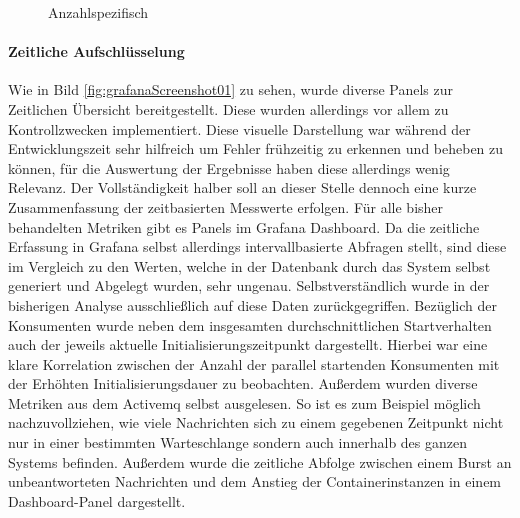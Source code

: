 \begin{figure}
  \centering
  \caption[Startzeit Container - Anzahl spezifisch]{Anzahlspezifisch}
  \label{fig:specContainers}
\end{figure}


\paragraph{Zeitliche Aufschlüsselung}
Wie in Bild \ref{fig:grafanaScreenshot01} zu sehen, wurde diverse Panels zur Zeitlichen Übersicht bereitgestellt. Diese wurden allerdings vor allem zu Kontrollzwecken implementiert. Diese visuelle Darstellung war während der Entwicklungszeit sehr hilfreich um Fehler frühzeitig zu erkennen und beheben zu können, für die Auswertung der Ergebnisse haben diese allerdings wenig Relevanz. Der Vollständigkeit halber soll an dieser Stelle dennoch eine kurze Zusammenfassung der zeitbasierten Messwerte erfolgen. Für alle bisher behandelten Metriken gibt es Panels im Grafana Dashboard. Da die zeitliche Erfassung in Grafana selbst allerdings intervallbasierte Abfragen stellt, sind diese im Vergleich zu den Werten, welche in der Datenbank durch das System selbst generiert und Abgelegt wurden, sehr ungenau. Selbstverständlich wurde in der bisherigen Analyse ausschließlich auf diese Daten zurückgegriffen. Bezüglich der Konsumenten wurde neben dem insgesamten durchschnittlichen Startverhalten auch der jeweils aktuelle Initialisierungszeitpunkt dargestellt. Hierbei war eine klare Korrelation zwischen der Anzahl der parallel startenden Konsumenten mit der Erhöhten Initialisierungsdauer zu beobachten. Außerdem wurden diverse Metriken aus dem Activemq selbst ausgelesen. So ist es zum Beispiel möglich nachzuvollziehen, wie viele Nachrichten sich zu einem gegebenen Zeitpunkt nicht nur in einer bestimmten Warteschlange sondern auch innerhalb des ganzen Systems befinden. Außerdem wurde die zeitliche Abfolge zwischen einem Burst an unbeantworteten Nachrichten und dem Anstieg der Containerinstanzen in einem Dashboard-Panel dargestellt.

